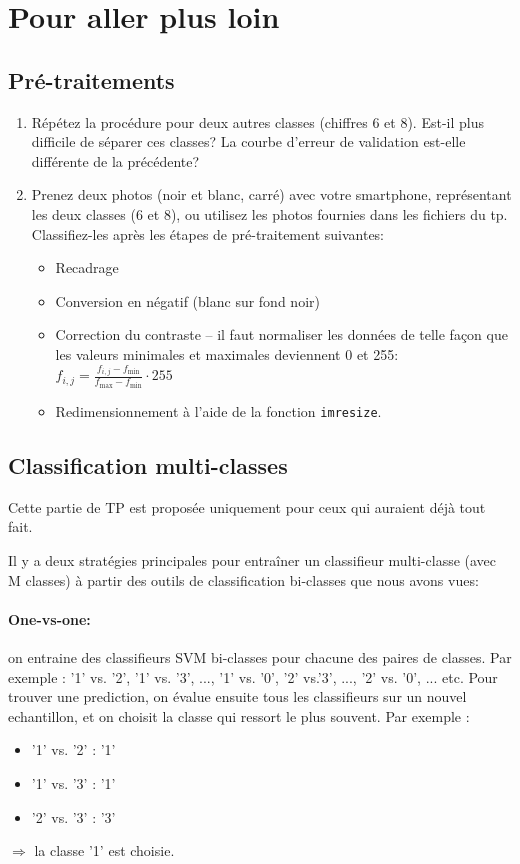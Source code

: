\section{Pour aller plus loin}

\subsection{Pré-traitements}

\begin{enumerate}
	\item Répétez la procédure pour deux autres classes (chiffres 6 et 8). Est-il plus difficile de séparer ces classes? La courbe d'erreur de validation est-elle différente de la précédente?
	\item Prenez deux photos (noir et blanc, carré) avec votre smartphone, représentant les deux classes (6 et 8), ou utilisez les photos fournies dans les fichiers du tp. Classifiez-les après les étapes de pré-traitement suivantes:
	\begin{itemize}[label=-]
		\item Recadrage
		\item Conversion en négatif (blanc sur fond noir)
		\item Correction du contraste -- il faut normaliser les données de telle façon que les valeurs minimales et maximales deviennent 0 et 255: $f_{i,j} = \frac{f_{i,j}-f_{\min}}{f_{\max}-f_{\min}}\cdot 255$
		\item Redimensionnement à l'aide de la fonction \texttt{imresize}.
	\end{itemize}
\end{enumerate}

\subsection{Classification multi-classes}

Cette partie de TP est proposée uniquement pour ceux qui auraient déjà tout fait.

Il y a deux stratégies principales pour entraîner un classifieur multi-classe (avec M classes) à partir des outils de classification bi-classes que nous avons vues:

\paragraph{One-vs-one:} on entraine des classifieurs SVM bi-classes pour chacune des  paires de classes. Par exemple : ’1’ vs. ’2’, ’1’ vs. ’3’, ..., ’1’ vs. ’0’, ’2’ vs.’3’, ..., ’2’ vs. ’0’, ... etc. Pour trouver une prediction, on évalue ensuite tous les classifieurs sur un nouvel echantillon, et on choisit la classe qui ressort le plus souvent. Par exemple :
\begin{itemize}[label=-]
	\item '1' vs. '2' : '1'
	\item '1' vs. ’3’ : '1'
	\item '2' vs. '3' : '3'
\end{itemize}
$\Rightarrow$ la classe '1' est choisie.

